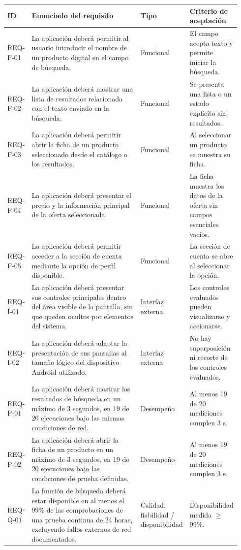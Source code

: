 \documentclass[10pt,a4paper]{article}
\begin{document}
	\small
	\begin{longtable}{p{0.09\linewidth}p{0.48\linewidth}p{0.16\linewidth}p{0.21\linewidth}}
		\toprule
		\textbf{ID} & \textbf{Enunciado del requisito} & \textbf{Tipo} & \textbf{Criterio de aceptación}\\
		\midrule
		\endhead
		REQ-F-01 & La aplicación deberá permitir al usuario introducir el nombre de un producto digital en el campo de búsqueda. & Funcional & El campo acepta texto y permite iniciar la búsqueda.\\
		REQ-F-02 & La aplicación deberá mostrar una lista de resultados relacionada con el texto enviado en la búsqueda. & Funcional & Se presenta una lista o un estado explícito sin resultados.\\
		REQ-F-03 & La aplicación deberá permitir abrir la ficha de un producto seleccionado desde el catálogo o los resultados. & Funcional & Al seleccionar un producto se muestra su ficha.\\
		REQ-F-04 & La aplicación deberá presentar el precio y la información principal de la oferta seleccionada. & Funcional & La ficha muestra los datos de la oferta sin campos esenciales vacíos.\\
		REQ-F-05 & La aplicación deberá permitir acceder a la sección de cuenta mediante la opción de perfil disponible. & Funcional & La sección de cuenta se abre al seleccionar la opción.\\
		REQ-I-01 & La aplicación deberá presentar sus controles principales dentro del área visible de la pantalla, sin que queden ocultos por elementos del sistema. & Interfaz externa & Los controles evaluados pueden visualizarse y accionarse.\\
		REQ-I-02 & La aplicación deberá adaptar la presentación de sus pantallas al tamaño lógico del dispositivo Android utilizado. & Interfaz externa & No hay superposición ni recorte de los controles evaluados.\\
		REQ-P-01 & La aplicación deberá mostrar los resultados de búsqueda en un máximo de 3 segundos, en 19 de 20 ejecuciones bajo las mismas condiciones de red. & Desempeño & Al menos 19 de 20 mediciones cumplen 3 s.\\
		REQ-P-02 & La aplicación deberá abrir la ficha de un producto en un máximo de 3 segundos, en 19 de 20 ejecuciones bajo las condiciones de prueba definidas. & Desempeño & Al menos 19 de 20 mediciones cumplen 3 s.\\
		REQ-Q-01 & La función de búsqueda deberá estar disponible en al menos el 99\% de las comprobaciones de una prueba continua de 24 horas, excluyendo fallos externos de red documentados. & Calidad: fiabilidad / disponibilidad & Disponibilidad medida $\geq$ 99\%.\\

\end{longtable}
\end{document}
